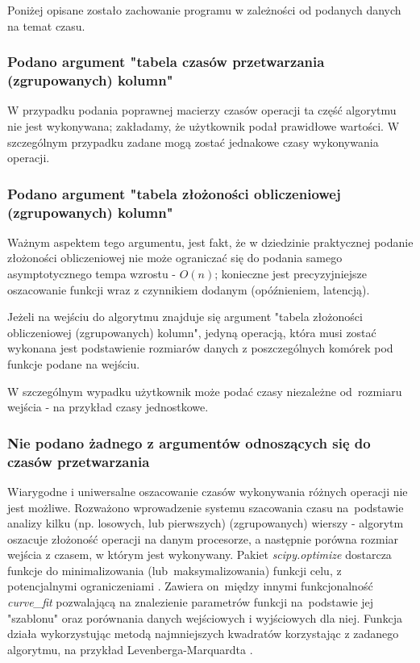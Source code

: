 \documentclass[brudnopis]{xmgr}
\begin{document}
Poniżej opisane zostało zachowanie programu w zależności od podanych danych na temat czasu.

\subsubsection{Podano argument "tabela czasów przetwarzania (zgrupowanych) kolumn"}

W przypadku podania poprawnej macierzy czasów operacji ta część algorytmu nie jest wykonywana; zakładamy, że użytkownik podał prawidłowe wartości.
W szczególnym przypadku zadane mogą zostać jednakowe czasy wykonywania operacji.

\subsubsection{Podano argument "tabela złożoności obliczeniowej (zgrupowanych) kolumn"}

Ważnym aspektem tego argumentu, jest fakt, że w dziedzinie praktycznej podanie złożoności obliczeniowej nie może ograniczać się do podania samego asymptotycznego tempa wzrostu - $O(n)$; konieczne jest precyzyjniejsze oszacowanie funkcji wraz z czynnikiem dodanym (opóźnieniem, latencją).
\medskip

Jeżeli na wejściu do algorytmu znajduje się argument "tabela złożoności obliczeniowej (zgrupowanych) kolumn", jedyną operacją, która musi zostać wykonana jest podstawienie rozmiarów danych z poszczególnych komórek pod funkcje podane na wejściu.
\medskip

W szczególnym wypadku użytkownik może podać czasy niezależne od~rozmiaru wejścia - na przykład czasy jednostkowe.
\medskip

\subsubsection{Nie podano żadnego z argumentów odnoszących się do czasów przetwarzania}

Wiarygodne i uniwersalne oszacowanie czasów wykonywania różnych operacji nie jest możliwe.
Rozważono wprowadzenie systemu szacowania czasu na~podstawie analizy kilku (np. losowych, lub pierwszych) (zgrupowanych) wierszy - algorytm oszacuje złożoność operacji na danym procesorze, a następnie porówna rozmiar wejścia z czasem, w którym jest wykonywany.
Pakiet \emph{scipy.optimize} dostarcza funkcje do minimalizowania (lub~maksymalizowania) funkcji celu, z potencjalnymi ograniczeniami \cite{scipyoptimize}. Zawiera on~między innymi funkcjonalność \emph{curve\_fit} pozwalającą na znalezienie parametrów funkcji na~podstawie jej "szablonu" oraz porównania danych wejściowych i wyjściowych dla niej.
Funkcja działa wykorzystując metodą najmniejszych kwadratów korzystając z zadanego algorytmu, na przykład Levenberga-Marquardta \cite{lourakis2005brief}.
\end{document}
